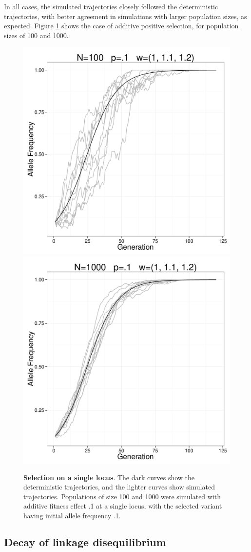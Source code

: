 \documentclass{article}
\begin{document}
In all cases, the simulated trajectories closely followed the deterministic trajectories,
with better agreement in simulations with larger population sizes, as expected.  Figure
\ref{figure_validation_selection} shows the case of additive positive selection, for
population sizes of 100 and 1000.


\begin{figure}[H]
    \begin{center}
        \includegraphics[width=.49\textwidth]{fig/validation_selection_100.pdf}
        \includegraphics[width=.49\textwidth]{fig/validation_selection_1000.pdf}
    \end{center}
    \caption{{\bf Selection on a single locus}.  The dark curves show the deterministic
             trajectories, and the lighter curves show simulated trajectories.  
             Populations of size 100 and 1000 were simulated with additive fitness effect .1 at a single locus,
             with the selected variant having initial allele frequency .1.}
    \label{figure_validation_selection}
\end{figure}



\subsection{Decay of linkage disequilibrium}
\end{document}
